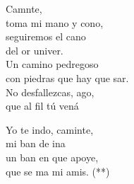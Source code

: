 \begin{cancion}[Caminante][]%
	Camnte,\\
	toma mi mano y cono,\\
	seguiremos el cano\\
	del or univer.\\
	\jump
Un camino pedregoso\\
	con piedras que hay que sar.\\
	No desfallezcas, ago,\\
	que al fil tú vená\jump\\
	\begin{chorus}%
		Yo te indo, caminte,\\
		mi ban de ina\\
		un ban en que apoye, \\
		que se ma mi amis. (**)\jump\\
	\end{chorus}%
\end{cancion}%
